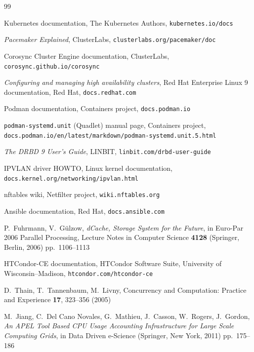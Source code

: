 \documentclass{webofc}
\begin{document}
\begin{thebibliography}{99}

Kubernetes documentation, The Kubernetes Authors,
\texttt{kubernetes.io/docs}

\textit{Pacemaker Explained}, ClusterLabs,
\texttt{clusterlabs.org/pacemaker/doc}

Corosync Cluster Engine documentation, ClusterLabs,
\texttt{corosync.github.io/corosync}

\textit{Configuring and managing high availability clusters},
Red Hat Enterprise Linux 9 documentation, Red Hat,
\texttt{docs.redhat.com}

Podman documentation, Containers project,
\texttt{docs.podman.io}

\texttt{podman-systemd.unit} (Quadlet) manual page, Containers project,
\texttt{docs.podman.io/en/latest/markdown/podman-systemd.unit.5.html}

\textit{The DRBD 9 User's Guide}, LINBIT,
\texttt{linbit.com/drbd-user-guide}

IPVLAN driver HOWTO, Linux kernel documentation,
\texttt{docs.kernel.org/networking/ipvlan.html}

nftables wiki, Netfilter project,
\texttt{wiki.nftables.org}

Ansible documentation, Red Hat,
\texttt{docs.ansible.com}

P.~Fuhrmann, V.~G\"ulzow, \textit{dCache, Storage System for the
Future}, in Euro-Par 2006 Parallel Processing, Lecture Notes in Computer
Science \textbf{4128} (Springer, Berlin, 2006) pp.~1106--1113

HTCondor-CE documentation, HTCondor Software Suite, University of
Wisconsin--Madison, \texttt{htcondor.com/htcondor-ce}

D.~Thain, T.~Tannenbaum, M.~Livny, Concurrency and Computation: Practice
and Experience \textbf{17}, 323--356 (2005)

M.~Jiang, C.~Del Cano Novales, G.~Mathieu, J.~Casson, W.~Rogers,
J.~Gordon, \textit{An APEL Tool Based CPU Usage Accounting
Infrastructure for Large Scale Computing Grids}, in Data Driven
e-Science (Springer, New York, 2011) pp.~175--186

\end{thebibliography}
\end{document}
